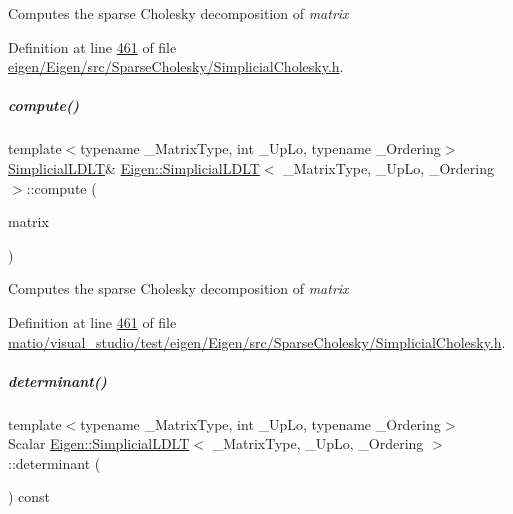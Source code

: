 Computes the sparse Cholesky decomposition of {\itshape matrix} 

Definition at line \hyperlink{eigen_2_eigen_2src_2_sparse_cholesky_2_simplicial_cholesky_8h_source_l00461}{461} of file \hyperlink{eigen_2_eigen_2src_2_sparse_cholesky_2_simplicial_cholesky_8h_source}{eigen/\+Eigen/src/\+Sparse\+Cholesky/\+Simplicial\+Cholesky.\+h}.

\mbox{\label{group___sparse_cholesky___module_a55429e59dbdf16a5696ee28bbf14e44f}} 
\subparagraph{\texorpdfstring{compute()}{compute()}\hspace{0.1cm}{\footnotesize\ttfamily [2/2]}}
{\footnotesize\ttfamily template$<$typename \+\_\+\+Matrix\+Type, int \+\_\+\+Up\+Lo, typename \+\_\+\+Ordering$>$ \\
\hyperlink{group___sparse_cholesky___module_class_eigen_1_1_simplicial_l_d_l_t}{Simplicial\+L\+D\+LT}\& \hyperlink{group___sparse_cholesky___module_class_eigen_1_1_simplicial_l_d_l_t}{Eigen\+::\+Simplicial\+L\+D\+LT}$<$ \+\_\+\+Matrix\+Type, \+\_\+\+Up\+Lo, \+\_\+\+Ordering $>$\+::compute (\begin{DoxyParamCaption}\item[{const Matrix\+Type \&}]{matrix }\end{DoxyParamCaption})\hspace{0.3cm}{\ttfamily [inline]}}

Computes the sparse Cholesky decomposition of {\itshape matrix} 

Definition at line \hyperlink{matio_2visual__studio_2test_2eigen_2_eigen_2src_2_sparse_cholesky_2_simplicial_cholesky_8h_source_l00461}{461} of file \hyperlink{matio_2visual__studio_2test_2eigen_2_eigen_2src_2_sparse_cholesky_2_simplicial_cholesky_8h_source}{matio/visual\+\_\+studio/test/eigen/\+Eigen/src/\+Sparse\+Cholesky/\+Simplicial\+Cholesky.\+h}.

\mbox{\label{group___sparse_cholesky___module_aa25042f3b49880f5e487d468ea20b1b7}} 
\subparagraph{\texorpdfstring{determinant()}{determinant()}\hspace{0.1cm}{\footnotesize\ttfamily [1/2]}}
{\footnotesize\ttfamily template$<$typename \+\_\+\+Matrix\+Type, int \+\_\+\+Up\+Lo, typename \+\_\+\+Ordering$>$ \\
Scalar \hyperlink{group___sparse_cholesky___module_class_eigen_1_1_simplicial_l_d_l_t}{Eigen\+::\+Simplicial\+L\+D\+LT}$<$ \+\_\+\+Matrix\+Type, \+\_\+\+Up\+Lo, \+\_\+\+Ordering $>$\+::determinant (\begin{DoxyParamCaption}{ }\end{DoxyParamCaption}) const\hspace{0.3cm}{\ttfamily [inline]}}

